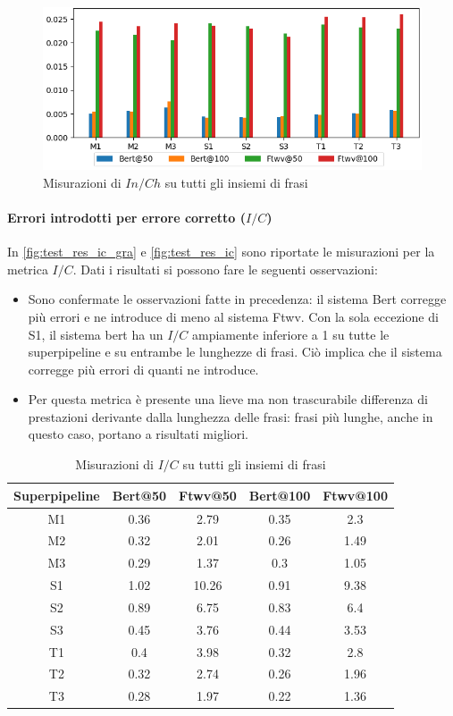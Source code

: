 \begin{figure}[H]
\centering
\includegraphics[width=\textwidth]{immagini/test/if}
\caption{Misurazioni di $In/Ch$ su tutti gli insiemi di frasi}
\label{fig:test_res_if}
\end{figure}

\paragraph{Errori introdotti per errore corretto ($I/C$)}
In \autoref{fig:test_res_ic_gra} e \autoref{fig:test_res_ic} sono riportate le misurazioni per la metrica $I/C$. Dati i risultati si possono fare le seguenti osservazioni:
\begin{itemize}
\item Sono confermate le osservazioni fatte in precedenza: il sistema Bert corregge più errori e ne introduce di meno al sistema Ftwv. Con la sola eccezione di S1, il sistema bert ha un $I/C$ ampiamente inferiore a 1 su tutte le superpipeline e su entrambe le lunghezze di frasi. Ciò implica che il sistema corregge più errori di quanti ne introduce.

\item Per questa metrica è presente una lieve ma non trascurabile differenza di prestazioni derivante dalla lunghezza delle frasi: frasi più lunghe, anche in questo caso, portano a risultati migliori.
\end{itemize}

\begin{table}[H]
\centering
\begin{tabular}{c|cc|cc}
\textbf{Superpipeline} & \textbf{Bert@50} &  \textbf{Ftwv@50} & \textbf{Bert@100} & \textbf{Ftwv@100}\\
\hline
M1& 0.36& 2.79& 0.35& 2.3\\
M2& 0.32& 2.01& 0.26& 1.49\\
M3& 0.29& 1.37& 0.3& 1.05\\
S1& 1.02& 10.26& 0.91& 9.38\\
S2& 0.89& 6.75& 0.83& 6.4\\
S3& 0.45& 3.76& 0.44& 3.53\\
T1& 0.4& 3.98& 0.32& 2.8\\
T2& 0.32& 2.74& 0.26& 1.96\\
T3& 0.28& 1.97& 0.22& 1.36\\
\end{tabular}
\caption{Misurazioni di $I/C$ su tutti gli insiemi di frasi}
\label{fig:test_res_ic_gra}
\end{table}

